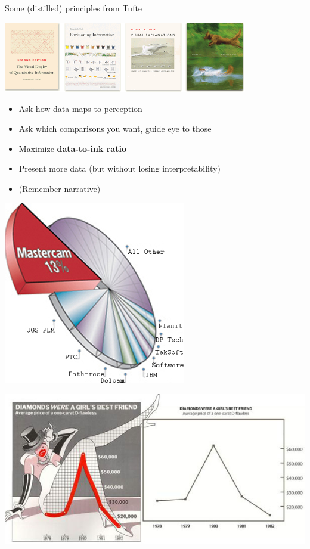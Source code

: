 \documentclass[xcolor=table,aspectratio=169]{beamer}
\begin{document}
\begin{frame}
  {Some (distilled) principles from Tufte}

  \includegraphics[width=0.8\textwidth]{pics/tufte-bookcovers.png}

  \begin{itemize}

  	\item Ask how data maps to perception
    \item Ask which comparisons you want, guide eye to those
    \item Maximize \textbf{data-to-ink ratio}
    \item Present more data (but without losing interpretability)
    \item (Remember  narrative)
  \end{itemize}
\end{frame}


\begin{frame}
  \includegraphics[height=\textheight]{pics/junk.jpg}
\end{frame}



%   
%   


\begin{frame}
  \includegraphics[width=\textwidth]{pics/junk-diamonds.jpg}
\end{frame}
\end{document}
